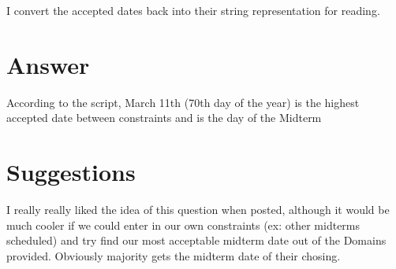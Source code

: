 \documentclass{article}
\begin{document}
    I convert the accepted dates back into their string representation for reading.
  \section{Answer}
    According to the script, March 11th (70th day of the year) is the highest accepted 
    date between constraints and is the day of the Midterm

  \section{Suggestions}
    I really really liked the idea of this question when posted, although it would be much cooler
    if we could enter in our own constraints (ex: other midterms scheduled) and try find our most
    acceptable midterm date out of the Domains provided. Obviously majority gets the midterm date of their chosing.
\end{document}
